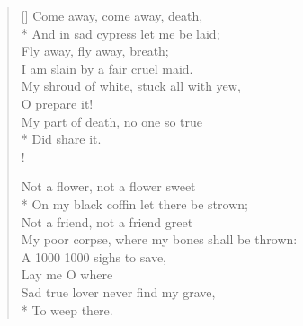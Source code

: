 \documentclass[MAIN]{subfiles}
\begin{document}
\settowidth{\versewidth}{Come away, come away, death,}
\begin{verse}[\versewidth]
\vin Come away, come away, death,\\*
And in sad cypress\marginnote{$\cdot$} let me be laid;\\
\vin Fly away, fly away, breath;\\
I am slain by a fair cruel maid.\\
My shroud of white, stuck all with yew,\\
\vin \vin O prepare it!\\
My part of death, no one so true\\*
\vin \vin Did share it.\\!

\vin Not a flower, not a flower sweet\\*
On my black coffin let there be strown;\\
\vin Not a friend, not a friend greet\\
My poor corpse, where my bones shall be thrown:\\
A 1000 1000 sighs to save,\\
\vin \vin Lay me O where\\
Sad true lover never find my grave,\\*
\vin \vin To weep there.
\end{verse}
\end{document}
